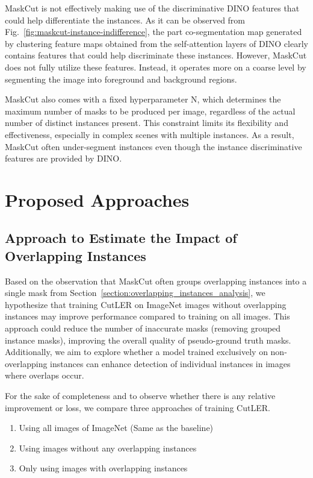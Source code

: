 MaskCut is not effectively making use of the discriminative DINO features that could help differentiate the instances. As it can be observed from Fig.~\ref{fig:maskcut-instance-indifference}, the part co-segmentation map generated by clustering feature maps obtained from the self-attention layers of DINO clearly contains features that could help discriminate these instances. However, MaskCut does not fully utilize these features. Instead, it operates more on a coarse level by segmenting the image into foreground and background regions.

MaskCut also comes with a fixed hyperparameter N, which determines the maximum number of masks to be produced per image, regardless of the actual number of distinct instances present. This constraint limits its flexibility and effectiveness, especially in complex scenes with multiple instances. As a result, MaskCut often under-segment instances even though the instance discriminative features are provided by DINO.

\section{Proposed Approaches}

\subsection{Approach to Estimate the Impact of Overlapping Instances}
\label{section:analysis_ol_instancs}

Based on the observation that MaskCut often groups overlapping instances into a single mask from Section~\ref{section:overlapping_instances_analysis}, we hypothesize that training CutLER on ImageNet images without overlapping instances may improve performance compared to training on all images. This approach could reduce the number of inaccurate masks (removing grouped instance masks), improving the overall quality of pseudo-ground truth masks. Additionally, we aim to explore whether a model trained exclusively on non-overlapping instances can enhance detection of individual instances in images where overlaps occur.

For the sake of completeness and to observe whether there is any relative improvement or loss, we compare three approaches of training CutLER. 

\begin{enumerate}
	\item Using all images of ImageNet (Same as the baseline)
	\item Using images without any overlapping instances 
	\item Only using images with overlapping instances
\end{enumerate}

